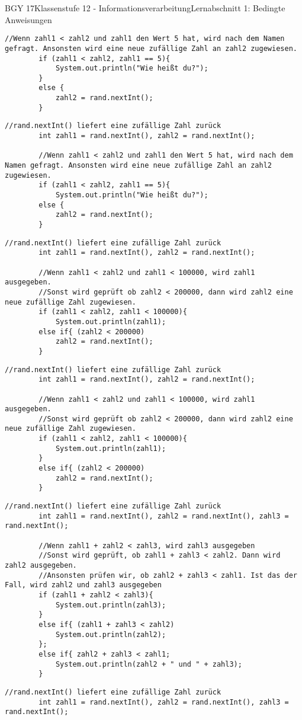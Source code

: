 \documentclass[oneside,openany,headings=optiontotoc,11pt,numbers=noenddot]{scrreprt}
\begin{document}
\begin{worksheet}{BGY 17}{Klassenstufe 12 - Informationsverarbeitung}{Lernabschnitt 1: Bedingte Anweisungen}
\begin{lstlisting}[style=JavaInputStyle]
		//Wenn zahl1 < zahl2 und zahl1 den Wert 5 hat, wird nach dem Namen gefragt. Ansonsten wird eine neue zufällige Zahl an zahl2 zugewiesen.
		if (zahl1 < zahl2, zahl1 == 5){
			System.out.println("Wie heißt du?");
		}
		else {
			zahl2 = rand.nextInt();
		}
		\end{lstlisting}
		\newpage
		\begin{lstlisting}[style=JavaInputStyle]
		//rand.nextInt() liefert eine zufällige Zahl zurück
		int zahl1 = rand.nextInt(), zahl2 = rand.nextInt();
		
		//Wenn zahl1 < zahl2 und zahl1 den Wert 5 hat, wird nach dem Namen gefragt. Ansonsten wird eine neue zufällige Zahl an zahl2 zugewiesen.
		if (zahl1 < zahl2, zahl1 == 5){
			System.out.println("Wie heißt du?");
		else {
			zahl2 = rand.nextInt();
		}
		\end{lstlisting}
		\newpage
		\begin{lstlisting}[style=JavaInputStyle]
		//rand.nextInt() liefert eine zufällige Zahl zurück
		int zahl1 = rand.nextInt(), zahl2 = rand.nextInt();
		
		//Wenn zahl1 < zahl2 und zahl1 < 100000, wird zahl1 ausgegeben.
		//Sonst wird geprüft ob zahl2 < 200000, dann wird zahl2 eine neue zufällige Zahl zugewiesen.
		if (zahl1 < zahl2, zahl1 < 100000){
			System.out.println(zahl1);
		else if{ (zahl2 < 200000)
			zahl2 = rand.nextInt();
		}
		\end{lstlisting}
		\newpage
		\begin{lstlisting}[style=JavaInputStyle]
		//rand.nextInt() liefert eine zufällige Zahl zurück
		int zahl1 = rand.nextInt(), zahl2 = rand.nextInt();
		
		//Wenn zahl1 < zahl2 und zahl1 < 100000, wird zahl1 ausgegeben.
		//Sonst wird geprüft ob zahl2 < 200000, dann wird zahl2 eine neue zufällige Zahl zugewiesen.
		if (zahl1 < zahl2, zahl1 < 100000){
			System.out.println(zahl1);
		}
		else if{ (zahl2 < 200000)
			zahl2 = rand.nextInt();
		}
		\end{lstlisting}
		\newpage
		\begin{lstlisting}[style=JavaInputStyle]
		//rand.nextInt() liefert eine zufällige Zahl zurück
		int zahl1 = rand.nextInt(), zahl2 = rand.nextInt(), zahl3 = rand.nextInt();
		
		//Wenn zahl1 + zahl2 < zahl3, wird zahl3 ausgegeben
		//Sonst wird geprüft, ob zahl1 + zahl3 < zahl2. Dann wird zahl2 ausgegeben.
		//Ansonsten prüfen wir, ob zahl2 + zahl3 < zahl1. Ist das der Fall, wird zahl2 und zahl3 ausgegeben
		if (zahl1 + zahl2 < zahl3){
			System.out.println(zahl3);
		}
		else if{ (zahl1 + zahl3 < zahl2)
			System.out.println(zahl2);
		};
		else if{ zahl2 + zahl3 < zahl1;
			System.out.println(zahl2 + " und " + zahl3);
		}
		\end{lstlisting}
		\newpage
		\begin{lstlisting}[style=JavaInputStyle]
		//rand.nextInt() liefert eine zufällige Zahl zurück
		int zahl1 = rand.nextInt(), zahl2 = rand.nextInt(), zahl3 = rand.nextInt();
		

\end{lstlisting}
\end{worksheet}
\end{document}
